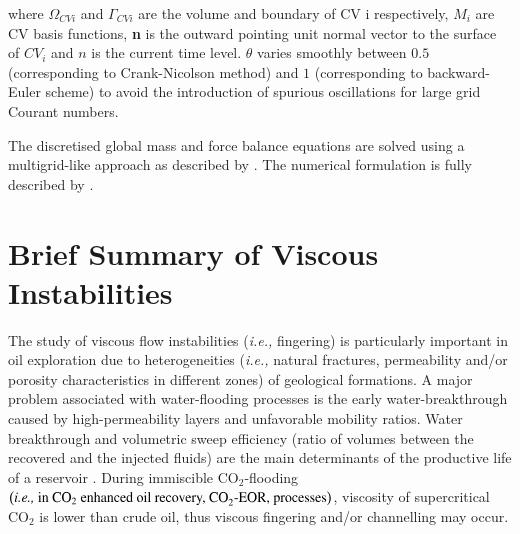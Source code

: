 \documentclass[preprint,authoryear,12pt]{elsarticle}
\newcommand{\ie}{{\it i.e., }}
\begin{document}
 

\noindent
where $\Omega_{CVi}$ and $\Gamma_{CVi}$ are the volume and boundary of CV i respectively, $M_{i}$ are CV basis functions, \textbf{n} is the outward pointing unit normal vector to the surface of $CV_{i}$ and $n$ is the current time level. $\theta$ varies smoothly between $0.5$ (corresponding to Crank-Nicolson method) and $1$ (corresponding to backward-Euler scheme) to avoid the introduction of spurious oscillations for large grid Courant numbers.

\medskip
The discretised global mass and force balance equations are solved using a multigrid-like approach as described by \citet{pavlidis2016} \citep[see also][]{salinas_2016}. The numerical formulation is fully described by \citet{gomes_2017} \citep[see also][]{salinas2015,adam_2016}. 

\section{Brief Summary of Viscous Instabilities}\label{section:ViscousInstabilities}
The study of viscous flow instabilities (\ie fingering) is particularly important in oil exploration due to heterogeneities (\ie natural fractures, permeability and/or porosity characteristics in different zones) of geological formations. A major problem associated with water-flooding processes is the early water-breakthrough caused by high-permeability layers and unfavorable mobility ratios. Water breakthrough and volumetric sweep efficiency (ratio of volumes between the recovered and the injected fluids) are the main determinants of the productive life of a reservoir \citep{riaz_2004, tavassoli_2015}. During immiscible CO$_{2}$-flooding $\left(\text{\ie in CO}_{2}\text{ enhanced oil recovery, CO}_{2}\text{-EOR, processes}\right)$, viscosity of supercritical CO$_{2}$ is lower than crude oil, thus viscous fingering and/or channelling may occur.
\end{document}
